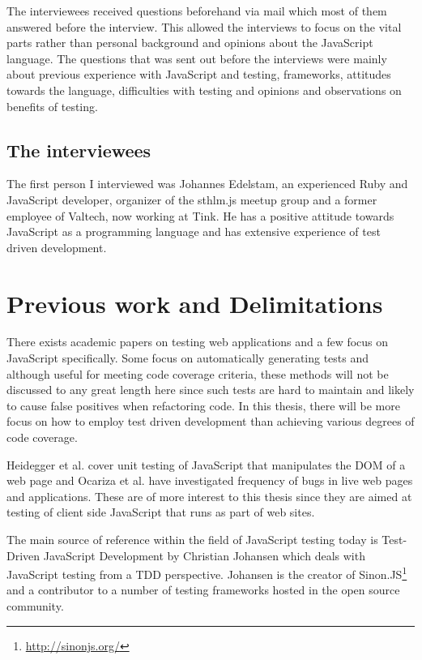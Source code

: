 \documentclass[11pt]{article}
\begin{document}
The interviewees received questions beforehand via mail which most of them answered before the interview. This allowed the interviews to focus on the vital parts rather than personal background and opinions about the JavaScript language. The questions that was sent out before the interviews were mainly about previous experience with JavaScript and testing, frameworks, attitudes towards the language, difficulties with testing and opinions and observations on benefits of testing.

\subsection{The interviewees}

The first person I interviewed was Johannes Edelstam, an experienced Ruby and JavaScript developer, organizer of the sthlm.js meetup group and a former employee of Valtech, now working at Tink. He has a positive attitude towards JavaScript as a programming language and has extensive experience of test driven development.

\section{Previous work and Delimitations}

There exists academic papers on testing web applications and a few focus on JavaScript specifically. Some focus on automatically generating tests\cite{AutomatedTesting} and although useful for meeting code coverage criteria, these methods will not be discussed to any great length here since such tests are hard to maintain and likely to cause false positives when refactoring code. In this thesis, there will be more focus on how to employ test driven development than achieving various degrees of code coverage.

Heidegger et al. cover unit testing of JavaScript that manipulates the DOM of a web page\cite{DOMJavascript} and Ocariza et al. have investigated frequency of bugs in live web pages and applications\cite{Wild}. These are of more interest to this thesis since they are aimed at testing of client side JavaScript that runs as part of web sites.

The main source of reference within the field of JavaScript testing today is Test-Driven JavaScript Development\cite{Tddjs} by Christian Johansen which deals with JavaScript testing from a TDD perspective. Johansen is the creator of Sinon.JS\footnote{\url{http://sinonjs.org/}} and a contributor to a number of testing frameworks hosted in the open source community.
\end{document}
